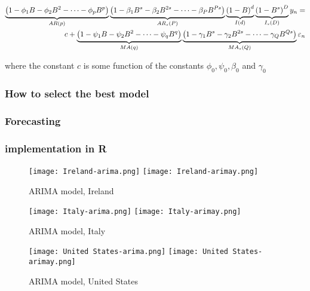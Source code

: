 \begin{align}
\underbrace{\left(1-\phi_1 B-\phi_2B^2-\dots-\phi_p B^p\right)}_{AR(p)}
\underbrace{\left(1-\beta_1 B^s-\beta_2B^{2s}-\dots-\beta_P B^{Ps}\right)}_{AR_s(P)} 
\underbrace{\left(1-B\right)^d}_{I(d)}\underbrace{\left(1-B^s\right)^D}_{I_s(D)}   y_n = \nonumber \\
 c+
\underbrace{\left(1-\psi_1 B-\psi_2B^2-\dots-\psi_q B^q\right)}_{MA(q)}
\underbrace{\left(1-\gamma_1 B^s-\gamma_2B^{2s}-\dots-\gamma_Q B^{Qs}\right)}_{MA_s(Q)} \varepsilon_n
\end{align}

where the constant $c$ is some function of the constants $\phi_0,\psi_0,\beta_0$ and $\gamma_0$ 

\subsubsection{How to select the best model}

\subsubsection{Forecasting}

\subsubsection{implementation in R}


\begin{figure}[H]
  \texttt{[image: Ireland-arima.png]} \label{fig:ireland-arima}
\endminipage\hfill
{}
  \texttt{[image: Ireland-arimay.png]} \label{fig:ireland-arimay}
\endminipage
\caption{ARIMA model, Ireland}
\end{figure}

\begin{figure}[H]
  \texttt{[image: Italy-arima.png]} \label{fig:italy-arima}
\endminipage\hfill
{}
  \texttt{[image: Italy-arimay.png]} \label{fig:italy-arimay}
\endminipage
\caption{ARIMA model, Italy}
\end{figure}

\begin{figure}[H]
  \texttt{[image: United States-arima.png]} \label{fig:usa-arima}
\endminipage\hfill
{}
  \texttt{[image: United States-arimay.png]} \label{fig:usa-arimay}
\endminipage
\caption{ARIMA model, United States}
\end{figure}

